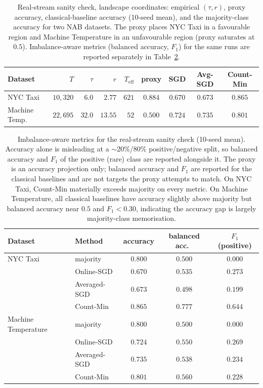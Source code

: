 \documentclass[preprint,12pt,authoryear]{elsarticle}
\newcommand{\Teff}{T_{\mathrm{eff}}}
\begin{document}
\begin{table}[t]
\centering
\caption{Real-stream sanity check, landscape coordinates: empirical $(\tau, r)$, proxy accuracy, classical-baseline accuracy (10-seed mean), and the majority-class accuracy for two NAB datasets. The proxy places NYC Taxi in a favourable region and Machine Temperature in an unfavourable region (proxy saturates at $0.5$). Imbalance-aware metrics (balanced accuracy, $F_1$) for the same runs are reported separately in Table~\ref{tab:real_stream_metrics}.}
\label{tab:real_stream}
\begin{tabular}{@{}lrrrrcccc@{}}
\toprule
Dataset & $T$ & $\tau$ & $r$ & $\Teff$ & proxy & SGD & Avg-SGD & Count-Min \\
\midrule
NYC Taxi          & $10{,}320$ & $6.0$  & $2.77$  & $621$ & $0.884$ & $0.670$ & $0.673$ & $0.865$ \\
Machine Temp.\    & $22{,}695$ & $32.0$ & $13.55$ & $52$  & $0.500$ & $0.724$ & $0.735$ & $0.801$ \\
\bottomrule
\end{tabular}
\end{table}

\begin{table}[t]
\centering
\caption{Imbalance-aware metrics for the real-stream sanity check (10-seed mean). Accuracy alone is misleading at a $\sim$20\%/80\% positive/negative split, so balanced accuracy and $F_1$ of the positive (rare) class are reported alongside it. The proxy is an accuracy projection only; balanced accuracy and $F_1$ are reported for the classical baselines and are not targets the proxy attempts to match. On NYC Taxi, Count-Min materially exceeds majority on every metric. On Machine Temperature, all classical baselines have accuracy slightly above majority but balanced accuracy near $0.5$ and $F_1 < 0.30$, indicating the accuracy gap is largely majority-class memorisation.}
\label{tab:real_stream_metrics}
\begin{tabular}{@{}llccc@{}}
\toprule
Dataset & Method & accuracy & balanced acc.\ & $F_1$ (positive) \\
\midrule
NYC Taxi              & majority           & $0.800$ & $0.500$ & $0.000$ \\
                      & Online-SGD         & $0.670$ & $0.535$ & $0.273$ \\
                      & Averaged-SGD       & $0.673$ & $0.498$ & $0.199$ \\
                      & Count-Min          & $0.865$ & $0.777$ & $0.644$ \\
\midrule
Machine Temperature   & majority           & $0.800$ & $0.500$ & $0.000$ \\
                      & Online-SGD         & $0.724$ & $0.550$ & $0.269$ \\
                      & Averaged-SGD       & $0.735$ & $0.538$ & $0.234$ \\
                      & Count-Min          & $0.801$ & $0.560$ & $0.228$ \\
\bottomrule
\end{tabular}
\end{table}
\end{document}
